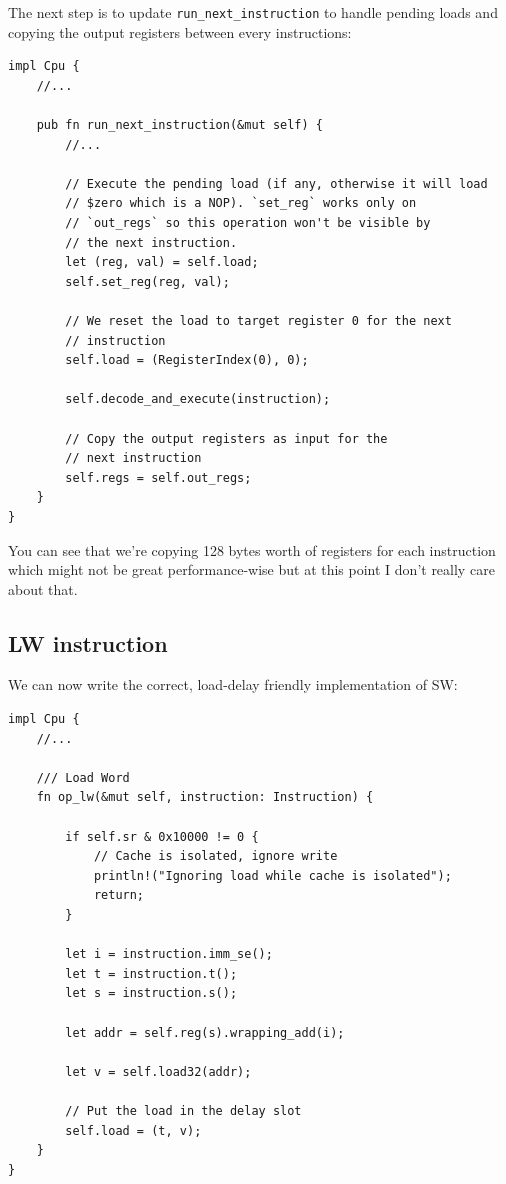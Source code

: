 \documentclass[a4paper]{article}
\newcommand{\code}[1] {\texttt{#1}}
\begin{document}
The next step is to update \code{run\_next\_instruction} to handle
pending loads and copying the output registers between every
instructions:

\begin{lstlisting}
impl Cpu {
    //...

    pub fn run_next_instruction(&mut self) {
        //...

        // Execute the pending load (if any, otherwise it will load
        // $zero which is a NOP). `set_reg` works only on
        // `out_regs` so this operation won't be visible by
        // the next instruction.
        let (reg, val) = self.load;
        self.set_reg(reg, val);

        // We reset the load to target register 0 for the next
        // instruction
        self.load = (RegisterIndex(0), 0);

        self.decode_and_execute(instruction);

        // Copy the output registers as input for the
        // next instruction
        self.regs = self.out_regs;
    }
}
\end{lstlisting}

You can see that we're copying 128 bytes worth of registers for each
instruction which might not be great performance-wise but at this
point I don't really care about that.

\subsection{LW instruction}

We can now write the correct, load-delay friendly implementation of
SW:

\begin{lstlisting}
impl Cpu {
    //...

    /// Load Word
    fn op_lw(&mut self, instruction: Instruction) {

        if self.sr & 0x10000 != 0 {
            // Cache is isolated, ignore write
            println!("Ignoring load while cache is isolated");
            return;
        }

        let i = instruction.imm_se();
        let t = instruction.t();
        let s = instruction.s();

        let addr = self.reg(s).wrapping_add(i);

        let v = self.load32(addr);

        // Put the load in the delay slot
        self.load = (t, v);
    }
}
\end{lstlisting}
\end{document}
